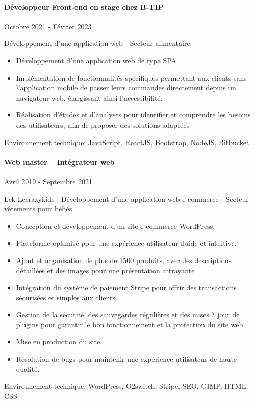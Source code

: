 \documentclass{article}
\begin{document}
\paragraph{Développeur Front-end en stage chez B-TIP}\hspace*{\fill}Octobre 2021 - Février 2023

\noindent
Développement d’une application web - Secteur alimentaire

\raggedright  
\begin{itemize}
  \item{Développement d'une application web de type SPA}
  \item{Implémentation de fonctionnalités spécifiques permettant aux clients sans l'application mobile de passer leurs commandes directement depuis un navigateur web, élargissant ainsi l'accessibilité.}
  \item{Réalisation d'études et d'analyses pour identifier et comprendre les besoins des utilisateurs, afin de proposer des solutions adaptées}
\end{itemize}
\noindent
Environnement technique: JavaScript, ReactJS, Bootstrap, NodeJS, Bitbucket
\paragraph{Web master – Intégrateur web}\hspace*{\fill}Avril 2019 - Septembre 2021

\noindent
Lck-Lecrazykids | Développement d’une application web e-commerce - Secteur vêtements pour bébés

\raggedright  
\begin{itemize}
  \item{Conception et développement d'un site e-commerce WordPress.}
  \item{Plateforme optimisé pour une expérience utilisateur fluide et intuitive.}
  \item{Ajout et organisation de plus de 1500 produits, avec des descriptions détaillées et des images pour une présentation attrayante}
  \item{Intégration du système de paiement Stripe pour offrir des transactions sécurisées et simples aux clients.}
  \item{Gestion de la sécurité, des sauvegardes régulières et des mises à jour de plugins pour garantir le bon fonctionnement et la protection du site web.}
  \item{Mise en production du site.}
  \item{Résolution de bugs pour maintenir une expérience utilisateur de haute qualité.}
\end{itemize}
\noindent
Environnement technique: WordPress, O2switch, Stripe, SEO, GIMP, HTML, CSS
\end{document}
